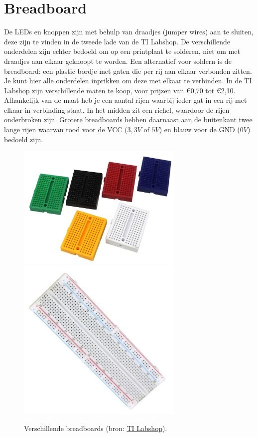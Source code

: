 \documentclass{guide}
\begin{document}
\section{Breadboard}
De LEDs en knoppen zijn met behulp van draadjes (jumper wires) aan te sluiten, deze zijn te vinden in de tweede lade van de TI Labshop. De verschillende onderdelen zijn echter bedoeld om op een printplaat te solderen, niet om met draadjes aan elkaar geknoopt te worden. Een alternatief voor soldern is de breadboard: een plastic bordje met gaten die per rij aan elkaar verbonden zitten. Je kunt hier alle onderdelen inprikken om deze met elkaar te verbinden. In de TI Labshop zijn verschillende maten te koop, voor prijzen van \euro 0,70 tot \euro 2,10. Afhankelijk van de maat heb je een aantal rijen waarbij ieder gat in een rij met elkaar in verbinding staat. In het midden zit een richel, waardoor de rijen onderbroken zijn. Grotere breadboards hebben daarnaast aan de buitenkant twee lange rijen waarvan rood voor de VCC ($3,3V$ of $5V$) en blauw voor de GND ($0V$) bedoeld zijn.


\begin{figure}[h]
  \centering
  \includegraphics[width=8cm]{images/bbsmall.png}
  \includegraphics[width=8cm]{images/bblarge.png}
  \caption{Verschillende breadboards (bron: \href{http://technische-informatica.nl/ti-lab-shop}{TI Labshop}).} \label{fig:breadboards}
\end{figure}
\end{document}
